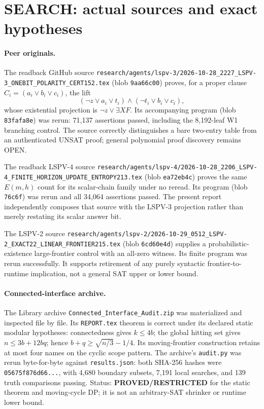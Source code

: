 \documentclass[11pt]{article}
\begin{document}
\section{SEARCH: actual sources and exact hypotheses}
\paragraph{Peer originals.}
The readback GitHub source
\texttt{research/agents/lspv-3/2026-10-28\_2227\_LSPV-3\_ONEBIT\_POLARITY\_CERT152.tex}
(blob \texttt{9aa66c00}) proves, for a proper clause $C_i=(a_i\vee b_i\vee c_i)$, the lift
\[
 (\neg z\vee a_i\vee t_i)\wedge(\neg t_i\vee b_i\vee c_i),
\]
whose existential projection is $\neg z\vee\exists X F$.  Its accompanying program (blob \texttt{83fafa8e}) was rerun: 71,137 assertions passed, including the 8,192-leaf W1 branching control.  The source correctly distinguishes a bare two-entry table from an authenticated UNSAT proof; general polynomial proof discovery remains OPEN.

The readback LSPV-4 source
\texttt{research/agents/lspv-4/2026-10-28\_2206\_LSPV-4\_FINITE\_HORIZON\_UPDATE\_ENTROPY213.tex}
(blob \texttt{ea72eb4c}) proves the same $E(m,h)$ count for its scalar-chain family under no reread.  Its program (blob \texttt{76c6f}) was rerun and all 34,064 assertions passed.  The present report independently composes that source with the LSPV-3 projection rather than merely restating its scalar answer bit.

The LSPV-2 source
\texttt{research/agents/lspv-2/2026-10-29\_0512\_LSPV-2\_EXACT22\_LINEAR\_FRONTIER215.tex}
(blob \texttt{6cd60e4d}) supplies a probabilistic-existence large-frontier control with an all-zero witness.  Its finite program was rerun successfully.  It supports retirement of any purely syntactic frontier-to-runtime implication, not a general SAT upper or lower bound.

\paragraph{Connected-interface archive.}
The Library archive \texttt{Connected\_Interface\_Audit.zip} was materialized and inspected file by file.  Its \texttt{REPORT.tex} theorem is correct under its declared static modular hypotheses: connectedness gives $k\le4b$; the global hitting set gives $n\le3b+12bq$; hence $b+q\ge\sqrt{n/3}-1/4$.  Its moving-frontier construction retains at most four names on the cyclic scope pattern.  The archive's \texttt{audit.py} was rerun byte-for-byte against \texttt{results.json}: both SHA-256 hashes were \texttt{05675f876d66...}, with 4,680 boundary subsets, 7,191 local searches, and 139 truth comparisons passing.  Status: \textbf{PROVED/RESTRICTED} for the static theorem and moving-cycle DP; it is not an arbitrary-SAT shrinker or runtime lower bound.
\end{document}
